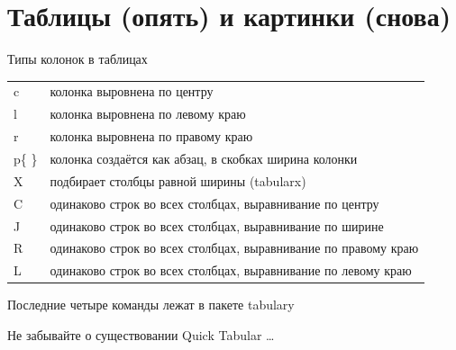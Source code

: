 \documentclass[aspectratio=169]{beamer} %
\begin{document}
\section{Таблицы (опять) и картинки (снова)} 


\begin{frame}
\begin{block}{Типы колонок в таблицах}
\centering 
	\begin{tabulary}{\textwidth}{JL}
		\toprule
			c & колонка выровнена по центру \\
			l & колонка выровнена по левому краю\\
			r & колонка выровнена по правому краю\\
	   p\{ \} & колонка создаётся как абзац, в скобках ширина колонки \\
		   X  & подбирает столбцы равной ширины (tabularx) \\
		   C  & одинаково строк во всех столбцах, выравнивание по центру  \\	  
		   J  & одинаково строк во всех столбцах, выравнивание по ширине \\
		   R  & одинаково строк во всех столбцах, выравнивание по правому краю \\
		   L  & одинаково строк во всех столбцах, выравнивание по левому краю  \\
		\bottomrule
	\end{tabulary}
\end{block}
\vspace{0.1cm} \centering
\large Последние четыре команды лежат в пакете tabulary

\alert{Не забывайте о существовании Quick Tabular \ldots}

\end{frame}
\end{document}
